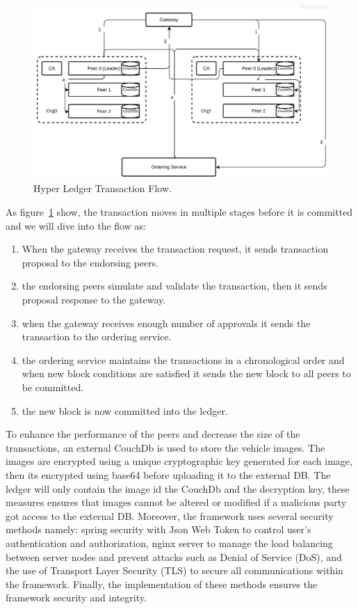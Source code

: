 \begin{figure}[H]
\centering
\includegraphics[width=\linewidth]{figures/hyper-ledger-flow}
\caption{Hyper Ledger Transaction Flow.}
\label{fig:hyper-ledger-wf}
\end{figure}
As figure~\ref{fig:hyper-ledger-wf}
show, the transaction moves in multiple stages before it is committed and we will dive into the flow as:
\begin{enumerate}
\item When the gateway receives the transaction request, it sends transaction proposal to the endorsing peers.
\item the endorsing peers simulate and validate the transaction, then it sends proposal response to the gateway.
\item when the gateway receives enough number of approvals it sends the transaction to the ordering service.
\item the ordering service maintains the transactions in a chronological order and when new block conditions are satisfied it sends
the new block to all peers to be committed.
\item the new block is now committed into the ledger.
\end{enumerate}
To enhance the performance of the peers and decrease the size of the transactions, an external
CouchDb is used to store the vehicle images. The images are encrypted using a unique cryptographic key generated for each
image, then its encrypted using base64 before uploading it to the external DB. The ledger will only contain the
image id the CouchDb and the decryption key, these measures ensures that images cannot be altered or modified if
a malicious party got access to the external DB. Moreover, the framework uses several security methods namely: spring security
with Json Web Token to control user's authentication and authorization, nginx server to manage the load balancing between server
nodes and prevent attacks such as Denial of Service (DoS), and the use of Transport Layer Security
(TLS) to secure all communications within the framework. Finally, the implementation of these methods ensures the framework security and
integrity. 